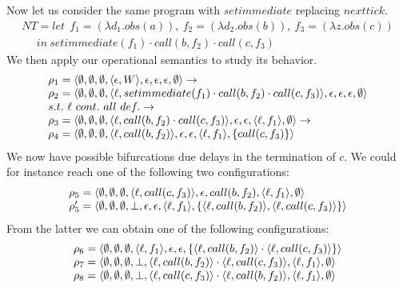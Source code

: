 Now let us consider the same program with $setimmediate$ replacing $nexttick$.
$$
\begin{array}{l}
NT=let\ \ f_1=(\lambda d_1.obs(a)),\ f_2=(\lambda d_2.obs(b)),\ f_3=(\lambda z. obs(c))\\
\ \ \ \ \ \ in \ setimmediate(f_1)\cdot call(b,f_2)\cdot call(c,f_3) 
\end{array}
$$
We then apply our operational semantics to study its behavior.
$$
\begin{array}{l}
\rho_1=\langle \emptyset,\emptyset,\emptyset,\langle \epsilon,W \rangle,\epsilon,\epsilon,\epsilon,\emptyset \rangle
\rightarrow\\
\rho_2=\langle \emptyset,\emptyset,\emptyset,\langle \ell,setimmediate(f_1)\cdot call(b,f_2)\cdot call(c,f_3) \rangle,\epsilon,\epsilon,\epsilon,\emptyset \rangle
\\ s.t.\ \ell\ cont.\ all\ def.
\rightarrow\\
\rho_3=\langle \emptyset,\emptyset,\emptyset,\langle \ell,call(b,f_2)\cdot call(c,f_3) \rangle,\epsilon,\epsilon,
\langle \ell,f_1 \rangle,\emptyset \rangle
\rightarrow\\
\rho_4=\langle \emptyset,\emptyset,\emptyset,\langle \ell,call(b,f_2) \rangle,\epsilon,\epsilon,\langle \ell,f_1 \rangle,
\{call(c,f_3)\} \rangle
\end{array}
$$
We now have possible bifurcations due delays in the termination of $c$.
We could for instance reach one of the following two configurations:
$$
\begin{array}{l}
\rho_5=\langle \emptyset,\emptyset,\emptyset,\langle \ell,call(c,f_3) \rangle,\epsilon,call(b,f_2),\langle \ell,f_1 \rangle,\emptyset \rangle
\\
\rho_5'=\langle \emptyset,\emptyset,\emptyset,\bot,\epsilon,\epsilon,\langle \ell,f_1 \rangle,
\{\langle \ell,call(b,f_2) \rangle,\langle \ell,call(c,f_3) \rangle\} \rangle
\end{array}
$$
From the latter we can obtain one of the following configurations:
$$
\begin{array}{l}
\rho_6=\langle \emptyset,\emptyset,\emptyset,\langle \ell,f_1 \rangle,\epsilon,
               \epsilon,\{\langle \ell,call(b,f_2) \rangle\cdot \langle \ell,call(c,f_3) \rangle\} \rangle
\\
\rho_7=\langle \emptyset,\emptyset,\emptyset,\bot,\langle \ell,call(b,f_2) \rangle\cdot \langle \ell,call(c,f_3) \rangle,
               \langle \ell,f_1 \rangle,\emptyset \rangle
\\
\rho_8=\langle \emptyset,\emptyset,\emptyset,\bot,\langle \ell,call(c,f_3) \rangle\cdot \langle \ell,call(b,f_2) \rangle,
               \langle \ell,f_1 \rangle,\emptyset \rangle
\end{array}
$$

